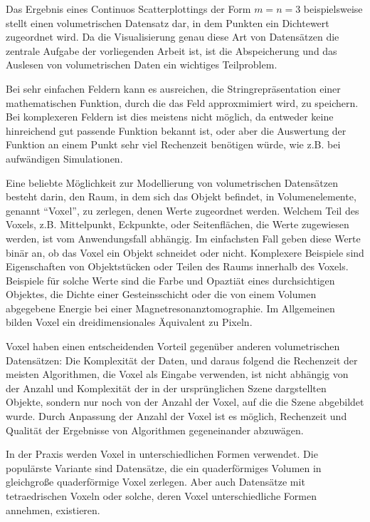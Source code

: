\documentclass[a4paper,fontsize=12pt,toc=bib,halfparskip]{scrartcl}
\begin{document}
Das Ergebnis eines Continuos Scatterplottings der Form $m=n=3$ beispielsweise stellt einen volumetrischen Datensatz dar, in dem Punkten ein Dichtewert zugeordnet wird. Da die Visualisierung genau diese Art von Datens\"atzen die zentrale Aufgabe der vorliegenden Arbeit ist, ist die Abspeicherung und das Auslesen von volumetrischen Daten ein wichtiges Teilproblem.

Bei sehr einfachen Feldern kann es ausreichen, die Stringrepr\"asentation einer mathematischen Funktion, durch die das Feld approxmimiert wird, zu speichern. Bei komplexeren Feldern ist dies meistens nicht m\"oglich, da entweder keine hinreichend gut passende Funktion bekannt ist, oder aber die Auswertung der Funktion an einem Punkt sehr viel Rechenzeit ben\"otigen w\"urde, wie z.B. bei aufw\"andigen Simulationen. 

Eine beliebte M\"oglichkeit zur Modellierung von volumetrischen Datens\"atzen besteht darin, den Raum, in dem sich das Objekt befindet, in Volumenelemente, genannt ``Voxel'', zu zerlegen, denen Werte zugeordnet werden. Welchem Teil des Voxels, z.B. Mittelpunkt, Eckpunkte, oder Seitenfl\"achen, die Werte zugewiesen werden, ist vom Anwendungsfall abh\"angig. Im einfachsten Fall geben diese Werte bin\"ar an, ob das Voxel ein Objekt schneidet oder nicht. Komplexere Beispiele sind Eigenschaften von Objektst\"ucken oder Teilen des Raums innerhalb des Voxels. Beispiele f\"ur solche Werte sind die Farbe und Opazti\"at eines durchsichtigen Objektes, die Dichte einer Gesteinsschicht oder die von einem Volumen abgegebene Energie bei einer Magnetresonanztomographie. Im Allgemeinen bilden Voxel ein dreidimensionales \"Aquivalent zu Pixeln.

Voxel haben einen entscheidenden Vorteil gegen\"uber anderen volumetrischen Datens\"atzen: Die Komplexit\"at der Daten, und daraus folgend die Rechenzeit der meisten Algorithmen, die Voxel als Eingabe verwenden, ist nicht abh\"angig von der Anzahl und Komplexit\"at der in der urspr\"unglichen Szene dargstellten Objekte, sondern  nur noch von der Anzahl der Voxel, auf die die Szene abgebildet wurde. Durch Anpassung der Anzahl der Voxel ist es m\"oglich, Rechenzeit und Qualit\"at der Ergebnisse von Algorithmen gegeneinander abzuw\"agen.

In der Praxis werden Voxel in unterschiedlichen Formen verwendet. Die popul\"arste Variante sind Datens\"atze, die ein quaderf\"ormiges Volumen in gleichgro{\ss}e quaderf\"ormige Voxel zerlegen. Aber auch Datens\"atze mit tetraedrischen Voxeln oder solche, deren Voxel unterschiedliche Formen annehmen, existieren.
\end{document}
